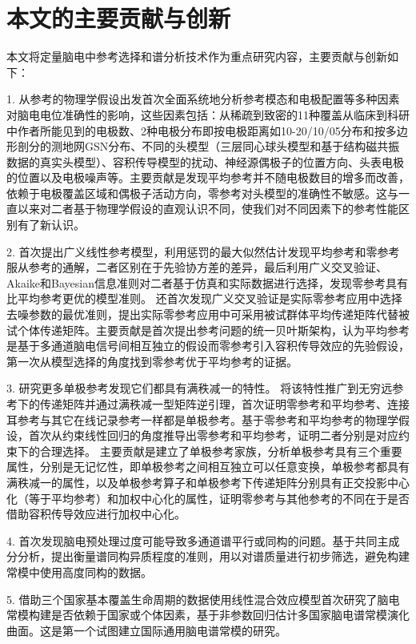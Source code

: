 \section{本文的主要贡献与创新}
本文将定量脑电中参考选择和谱分析技术作为重点研究内容，主要贡献与创新如下：

1. 从参考的物理学假设出发首次全面系统地分析参考模态和电极配置等多种因素对脑电电位准确性的影响，这些因素包括：从稀疏到致密的11种覆盖从临床到科研中作者所能见到的电极数、2种电极分布即按电极距离如10-20/10/05分布和按多边形剖分的测地网GSN分布、不同的头模型（三层同心球头模型和基于结构磁共振数据的真实头模型）、容积传导模型的扰动、神经源偶极子的位置方向、头表电极的位置以及电极噪声等。主要贡献是发现平均参考并不随电极数目的增多而改善，依赖于电极覆盖区域和偶极子活动方向，零参考对头模型的准确性不敏感。这与一直以来对二者基于物理学假设的直观认识不同，使我们对不同因素下的参考性能区别有了新认识。

2. 首次提出广义线性参考模型，利用惩罚的最大似然估计发现平均参考和零参考服从参考的通解，二者区别在于先验协方差的差异，最后利用广义交叉验证、Akaike和Bayesian信息准则对二者基于仿真和实际数据进行选择，发现零参考具有比平均参考更优的模型准则。 还首次发现广义交叉验证是实际零参考应用中选择去噪参数的最优准则，提出实际零参考应用中可采用被试群体平均传递矩阵代替被试个体传递矩阵。主要贡献是首次提出参考问题的统一贝叶斯架构，认为平均参考是基于多通道脑电信号间相互独立的假设而零参考引入容积传导效应的先验假设，第一次从模型选择的角度找到零参考优于平均参考的证据。

3. 研究更多单极参考发现它们都具有满秩减一的特性。 将该特性推广到无穷远参考下的传递矩阵并通过满秩减一型矩阵逆引理，首次证明零参考和平均参考、连接耳参考与其它在线记录参考一样都是单极参考。基于零参考和平均参考的物理学假设，首次从约束线性回归的角度推导出零参考和平均参考，证明二者分别是对应约束下的合理选择。 主要贡献是建立了单极参考家族，分析单极参考具有三个重要属性，分别是无记忆性，即单极参考之间相互独立可以任意变换，单极参考都具有满秩减一的属性，以及单极参考算子和单极参考下传递矩阵分别具有正交投影中心化（等于平均参考）和加权中心化的属性，证明零参考与其他参考的不同在于是否借助容积传导效应进行加权中心化。

4. 首次发现脑电预处理过度可能导致多通道谱平行或同构的问题。基于共同主成分分析，提出衡量谱同构异质程度的准则，用以对谱质量进行初步筛选，避免构建常模中使用高度同构的数据。

5. 借助三个国家基本覆盖生命周期的数据使用线性混合效应模型首次研究了脑电常模构建是否依赖于国家或个体因素，基于非参数回归估计多国家脑电谱常模演化曲面。这是第一个试图建立国际通用脑电谱常模的研究。

